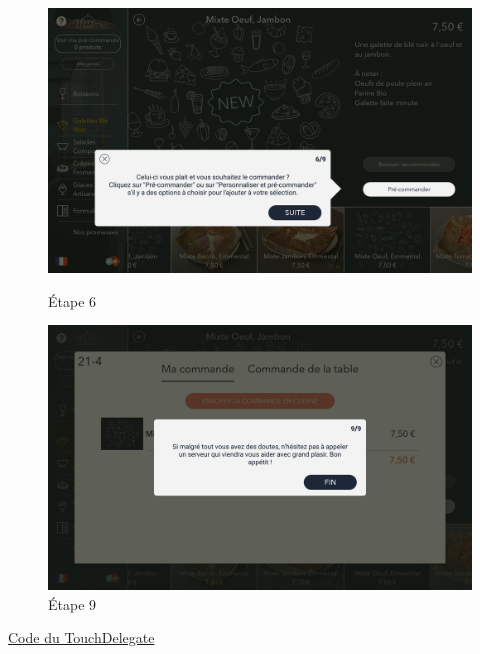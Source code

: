 \begin{figure}[!htb]
  \centering
  \begin{minipage}[b]{0.45\textwidth}
    \includegraphics[width=\textwidth]{images/tuto5.png}
    \caption{Étape 6}
  \end{minipage}
  \hfill
  \begin{minipage}[b]{0.45\textwidth}
    \includegraphics[width=\textwidth]{images/tuto6.png}
    \caption{Étape 9}
  \end{minipage}
\end{figure}

\clearpage

\underline{Code du TouchDelegate}

